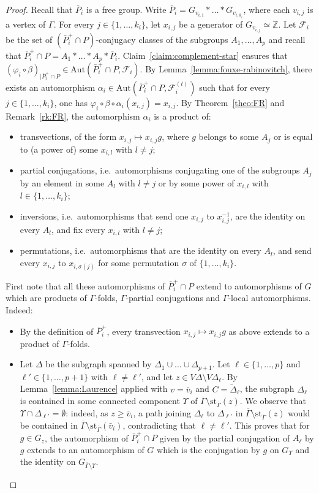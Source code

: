\documentclass[a4paper,english,11pt]{article}
\theoremstyle{definition}
\theoremstyle{remark}
\newcommand{\st}{\mathrm{st}}
\newcommand{\Aut}{\mathrm{Aut}}
\newcommand{\calf}{\mathcal{F}}
\begin{document}
\begin{proof}
Recall that $\bar P_i$ is a free group. Write $\bar P_i = G_{v_{i,1}}\ast\dots\ast G_{v_{i,k_i}}$, where each $v_{i,j}$ is a vertex of $\Gamma$. For every $j\in\{1,\dots,k_i\}$, let $x_{i,j}$ be a generator of $G_{v_{i,j}}\simeq\mathbb{Z}$. Let $\calf_i$ be the set of $(\bar P_i^+\cap P)$-conjugacy classes of the subgroups $A_1,\dots,A_p$ and recall that $\bar{P}_i^+\cap P = A_1*\dots *A_p*\bar{P}_i$. Claim~\ref{claim:complement-star} ensures that $(\varphi_i\circ\beta)_{|\bar P_i^+\cap P}\in\Aut(\bar P_i^+\cap P,\calf_i)$. By Lemma~\ref{lemma:fouxe-rabinovitch}, there exists an automorphism $\alpha_i\in\Aut(\bar P_i^+\cap P,\calf_i^{(t)})$ such that for every $j\in\{1,\dots,k_i\}$, one has $\varphi_i\circ\beta\circ\alpha_i(x_{i,j})=x_{i,j}$. By Theorem~\ref{theo:FR} and Remark~\ref{rk:FR}, the automorphism $\alpha_i$ is a product of: 
\begin{itemize}
\item transvections, of the form $x_{i,j}\mapsto x_{i,j}g$, where $g$ belongs to some $A_j$ or is equal to (a power of) some $x_{i,l}$ with $l\neq j$;
\item partial conjugations, i.e.\ automorphisms conjugating one of the subgroups $A_j$ by an element in some $A_l$ with $l\neq j$ or by some power of $x_{i,l}$ with $l\in\{1,\dots,k_i\}$;  
\item inversions, i.e.\ automorphisms that send one $x_{i,j}$ to $x_{i,j}^{-1}$, are the identity on every $A_l$, and fix every $x_{i,l}$ with $l\neq j$;
    \item permutations, i.e.\ automorphisms that are the identity on every $A_l$, and send every $x_{i,j}$ to $x_{i,\sigma(j)}$ for some permutation $\sigma$ of $\{1,\dots,k_i\}$.
\end{itemize}
First note that all these automorphisms of $\bar P_i^+\cap P$ extend to automorphisms of $G$ which are products of $\Gamma$-folds, $\Gamma$-partial conjugations and $\Gamma$-local automorphisms. Indeed: 
\begin{itemize}
\item By the definition of $\bar P_i^+$, every transvection $x_{i,j}\mapsto x_{i,j}g$ as above extends to a product of $\Gamma$-folds.
\item Let $\Delta$ be the subgraph spanned by $\Delta_1\cup\dots\cup\Delta_{p+1}$. Let $\ell\in\{1,\dots,p\}$ and $\ell'\in\{1,\dots,p+1\}$ with $\ell\neq \ell'$, and let $z\in V\Delta\setminus V\Delta_\ell$. By Lemma~\ref{lemma:Laurence} applied with $v=\bar v_i$ and $C=\tilde{\Delta}_\ell$, the subgraph $\Delta_\ell$ is contained in some connected component $\Upsilon$ of $\overline{\Gamma}\setminus\st_{\overline{\Gamma}}(z)$. We observe that $\Upsilon\cap\Delta_{\ell'}=\emptyset$: indeed, as $z\ge \bar v_i$, a path joining $\Delta_\ell$ to $\Delta_{\ell'}$ in  $\overline{\Gamma}\setminus\st_{\overline{\Gamma}}(z)$ would be contained in $\overline{\Gamma}\setminus\st_{\overline{\Gamma}}(\bar v_i)$, contradicting that $\ell\neq\ell'$. This proves that for $g\in G_z$, the automorphism of $\bar P_i^+\cap P$ given by the partial conjugation of $A_\ell$ by $g$ extends to an automorphism of $G$ which is the conjugation by $g$ on $G_{\Upsilon}$ and the identity on $G_{\overline{\Gamma}\setminus\Upsilon}$. 

\end{itemize}
\end{proof}
\end{document}
